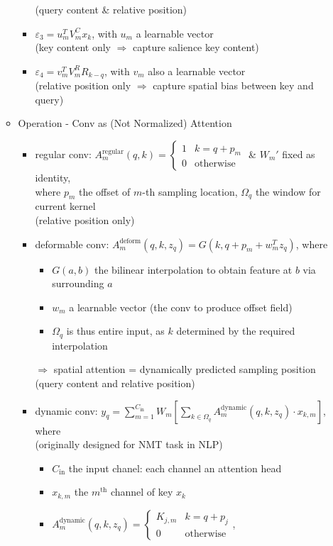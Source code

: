 \begin{itemize}
\begin{itemize}
\begin{itemize}
		(query content \& relative position)
		\item $\varepsilon_3 = u_m^TV_m^Cx_k$, with $u_m$ a learnable vector \\
		(key content only $\Rightarrow$ capture salience key content)
		\item $\varepsilon_4 = v_m^TV_m^RR_{k-q}$, with $v_m$ also a learnable vector \\
		(relative position only $\Rightarrow$ capture spatial bias between key and query)
		\end{itemize}
	\item Operation - Conv as (Not Normalized) Attention
		\begin{itemize}
		\item regular conv: $A_m^\text{regular}(q, k) = \begin{cases} 1 & k=q+p_m \\ 0 & \text{otherwise} \end{cases}$ \& $W_m'$ fixed as identity, \\
		where $p_m$ the offset of $m$-th sampling location, $\Omega_q$ the window for current kernel \\
		(relative position only)
		\item deformable conv: $A_m^\text{deform}(q, k, z_q)=G(k, q+p_m+w_m^Tz_q)$, where
			\begin{itemize}
			\item $G(a, b)$ the bilinear interpolation to obtain feature at $b$ via surrounding $a$
			\item $w_m$ a learnable vector (the conv to produce offset field)
			\item $\Omega_q$ is thus entire input, as $k$ determined by the required interpolation
			\end{itemize}
		$\Rightarrow$ spatial attention = dynamically predicted sampling position \\
		(query content and relative position)
		\item dynamic conv: $y_q=\sum_{m=1}^{C_\text{in}}W_m[\sum_{k\in\Omega_q}A_m^\text{dynamic}(q, k, z_q)\cdot x_{k,m}]$, where \\
		(originally designed for NMT task in NLP)
			\begin{itemize}
			\item $C_{\text{in}}$ the input chanel: each channel an attention head
			\item $x_{k, m}$ the $m^\text{th}$ channel of key $x_k$
			\item $A_m^\text{dynamic}(q, k, z_q) = \begin{cases} K_{j,m} & k=q+p_j \\ 0 & \text{otherwise} \end{cases}$, \\

\end{itemize}
\end{itemize}
\end{itemize}
\end{itemize}
